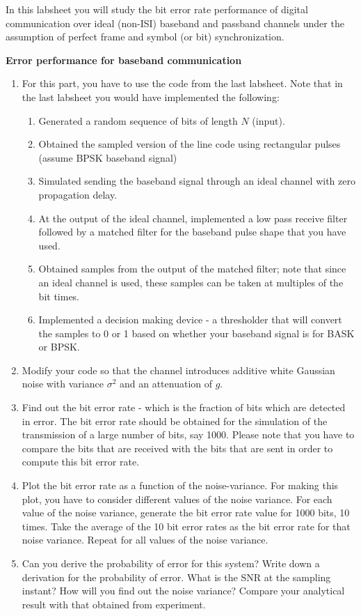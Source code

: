In this labsheet you will study the bit error rate performance of digital communication over ideal (non-ISI) baseband and passband channels under the assumption of perfect frame and symbol (or bit) synchronization.

\myhrule
\noindent
\textbf{Error performance for baseband communication}
\begin{enumerate}
\item For this part, you have to use the code from the last labsheet. Note that in the last labsheet you would have implemented the following:
\begin{enumerate}
\item Generated a random sequence of bits of length $N$ (input).
\item Obtained the sampled version of the line code using rectangular pulses (assume BPSK baseband signal)
\item Simulated sending the baseband signal through an ideal channel with zero propagation delay. 
\item At the output of the ideal channel, implemented a low pass receive filter followed by a matched filter for the baseband pulse shape that you have used. 
\item Obtained samples from the output of the matched filter; note that since an ideal channel is used, these samples can be taken at multiples of the bit times.
\item Implemented a decision making device - a thresholder that will convert the samples to 0 or 1 based on whether your baseband signal is for BASK or BPSK.
\end{enumerate}
\item Modify your code so that the channel introduces additive white Gaussian noise with variance $\sigma^2$ and an attenuation of $g$.
\item Find out the bit error rate - which is the fraction of bits which are detected in error. The bit error rate should be obtained for the simulation of the transmission of a large number of bits, say 1000. Please note that you have to compare the bits that are received with the bits that are sent in order to compute this bit error rate.
\item Plot the bit error rate as a function of the noise-variance. For making this plot, you have to consider different values of the noise variance. For each value of the noise variance, generate the bit error rate value for 1000 bits, 10 times. Take the average of the 10 bit error rates as the bit error rate for that noise variance. Repeat for all values of the noise variance.
\item Can you derive the probability of error for this system? Write down a derivation for the probability of error. What is the SNR at the sampling instant? How will you find out the noise variance? Compare your analytical result with that obtained from experiment.
\end{enumerate}

